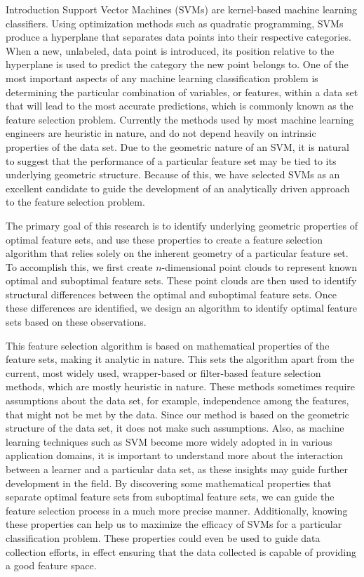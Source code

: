 \documentclass{llncs}
\begin{document}
\begin{section}{Introduction}
Support Vector Machines (SVMs) are kernel-based machine learning classifiers\cite{Vapnik}. Using optimization methods such as quadratic programming, SVMs produce a hyperplane that separates data points into their respective categories. When a new, unlabeled, data point is introduced, its position relative to the hyperplane is used to predict the category the new point belongs to. One of the most important aspects of any machine learning classification problem is determining the particular combination of variables, or features, within a data set that will lead to the most accurate predictions, which is commonly known as the feature selection problem. Currently the methods used  by most machine learning engineers are heuristic in nature, and do not depend heavily on intrinsic properties of the data set\cite{HanKamber}. Due to the geometric nature of an SVM, it is natural to suggest that the performance of a particular feature set may be tied to its underlying geometric structure. Because of this, we have selected SVMs as an excellent candidate to guide the development of an analytically driven approach to the feature selection problem. 
	
	
The primary goal of this research is to identify underlying geometric properties of optimal feature sets, and use these properties to create a feature selection algorithm that relies solely on the inherent geometry of a particular feature set. To accomplish this, we first create $n$-dimensional point clouds to represent known optimal and suboptimal feature sets. These point clouds are then used to identify structural differences between the optimal and suboptimal feature sets. Once these differences are identified, we design an algorithm to identify optimal feature sets based on these observations.

This feature selection algorithm is based on mathematical properties of the feature sets, making it analytic in nature. This sets the algorithm apart from the current, most widely used, wrapper-based or filter-based feature selection methods, which are mostly heuristic in nature\cite{HanKamber}. These methods sometimes require assumptions about the data set, for example, independence among the features, that might not be met by the data. Since our method is based on the geometric structure of the data set, it does not make such assumptions. Also, as machine learning techniques such as SVM become more widely adopted in in various application domains, it is important to understand more about the interaction between a learner and a particular data set, as these insights may guide further development in the field. By discovering some mathematical properties that separate optimal feature sets from suboptimal feature sets, we can guide the feature selection process in a much more precise manner. Additionally, knowing these properties can help us to maximize the efficacy of SVMs for a particular classification problem. These properties could even be used to guide data collection efforts, in effect ensuring that the data collected is capable of providing a good feature space.


\end{section}
\end{document}

